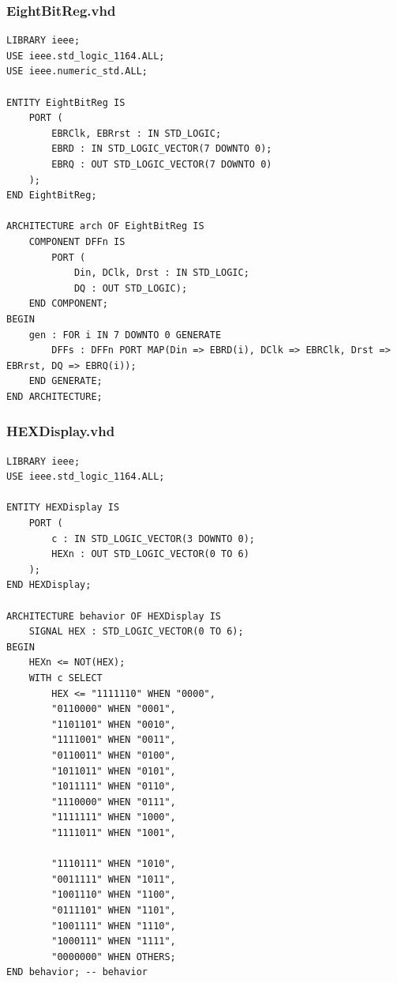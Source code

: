 \documentclass[13pt,a4paper]{report}
\begin{document}
\subsubsection{EightBitReg.vhd}
\begin{verbatim}
LIBRARY ieee;
USE ieee.std_logic_1164.ALL;
USE ieee.numeric_std.ALL;

ENTITY EightBitReg IS
	PORT (
		EBRClk, EBRrst : IN STD_LOGIC;
		EBRD : IN STD_LOGIC_VECTOR(7 DOWNTO 0);
		EBRQ : OUT STD_LOGIC_VECTOR(7 DOWNTO 0)
	);
END EightBitReg;

ARCHITECTURE arch OF EightBitReg IS
	COMPONENT DFFn IS
		PORT (
			Din, DClk, Drst : IN STD_LOGIC;
			DQ : OUT STD_LOGIC);
	END COMPONENT;
BEGIN
	gen : FOR i IN 7 DOWNTO 0 GENERATE
		DFFs : DFFn PORT MAP(Din => EBRD(i), DClk => EBRClk, Drst => EBRrst, DQ => EBRQ(i));
	END GENERATE;
END ARCHITECTURE;
\end{verbatim}

\subsubsection{HEXDisplay.vhd}
\begin{verbatim}
LIBRARY ieee;
USE ieee.std_logic_1164.ALL;

ENTITY HEXDisplay IS
	PORT (
		c : IN STD_LOGIC_VECTOR(3 DOWNTO 0);
		HEXn : OUT STD_LOGIC_VECTOR(0 TO 6)
	);
END HEXDisplay;

ARCHITECTURE behavior OF HEXDisplay IS
	SIGNAL HEX : STD_LOGIC_VECTOR(0 TO 6);
BEGIN
	HEXn <= NOT(HEX);
	WITH c SELECT
		HEX <= "1111110" WHEN "0000",
		"0110000" WHEN "0001",
		"1101101" WHEN "0010",
		"1111001" WHEN "0011",
		"0110011" WHEN "0100",
		"1011011" WHEN "0101",
		"1011111" WHEN "0110",
		"1110000" WHEN "0111",
		"1111111" WHEN "1000",
		"1111011" WHEN "1001",

		"1110111" WHEN "1010",
		"0011111" WHEN "1011",
		"1001110" WHEN "1100",
		"0111101" WHEN "1101",
		"1001111" WHEN "1110",
		"1000111" WHEN "1111",
		"0000000" WHEN OTHERS;
END behavior; -- behavior
\end{verbatim}
\end{document}
